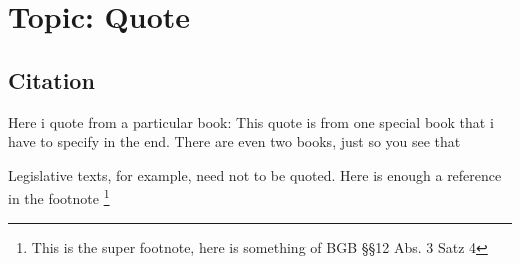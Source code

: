 \chapter{Topic: Quote}


\section{Citation}

Here i quote from a particular book: This quote is from one special book that i have to specify in the end. There are even two books, just so you see that \cite{Williams201205,Siegert200612}


Legislative texts, for example, need not to be quoted. Here is enough a reference in the footnote \footnote{This is the super footnote, here is something of BGB §§12 Abs. 3 Satz 4}


